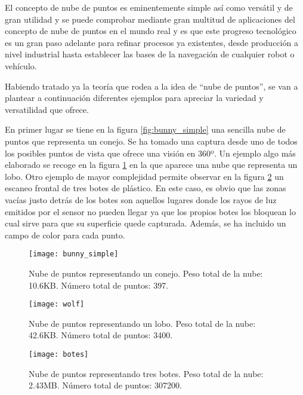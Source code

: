 El concepto de nube de puntos es eminentemente simple así como versátil y de gran utilidad y se puede comprobar mediante gran multitud de aplicaciones del concepto de nube de puntos en el mundo real y es que este progreso tecnológico es un gran paso adelante para refinar procesos ya existentes, desde producción a nivel industrial hasta establecer las bases de la navegación de cualquier robot o vehículo.

Habiendo tratado ya la teoría que rodea a la idea de ``nube de puntos'', se van a plantear a continuación diferentes ejemplos para apreciar la variedad y versatilidad que ofrece.

En primer lugar se tiene en la figura \ref{fig:bunny_simple} una sencilla nube de puntos que representa un conejo. Se ha tomado una captura desde uno de todos los posibles puntos de vista que ofrece una visión en 360º.
Un ejemplo algo más elaborado se recoge en la figura \ref{fig:wolf} en la que aparece una nube que representa un lobo. 
Otro ejemplo de mayor complejidad permite observar en la figura \ref{fig:botes_grande} un escaneo frontal de tres botes de plástico. En este caso, es obvio que las zonas vacías justo detrás de los botes son aquellos lugares donde los rayos de luz emitidos por el sensor no pueden llegar ya que los propios botes los bloquean lo cual sirve para que su superficie quede capturada. Además, se ha incluido un campo de color para cada punto.


\begin{figure}[!htb]
  \texttt{[image: bunny\_simple]}
  \caption{Nube de puntos representando un conejo.
  Peso total de la nube: 10.6KB.
  Número total de puntos: 397.}\label{fig:bunny_simple}
\endminipage\hfill
{}
  \texttt{[image: wolf]}
  \caption{Nube de puntos representando un lobo.
  Peso total de la nube: 42.6KB.
  Número total de puntos: 3400.}\label{fig:wolf}
\endminipage\hfill

\end{figure}

\begin{figure}
\centering
\texttt{[image: botes]}
  \caption{Nube de puntos representando tres botes.
  Peso total de la nube: 2.43MB.
  Número total de puntos: 307200.}\label{fig:botes_grande}
\end{figure}



